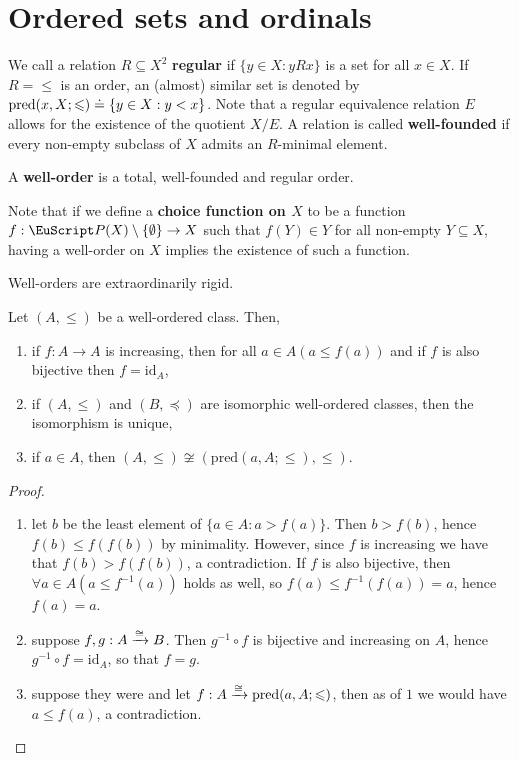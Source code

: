 \documentclass[twoside,openright,titlepage,numbers=noenddot,%
               headinclude,footinclude,cleardoublepage=empty,abstract=on,
               BCOR=23mm,paper=letter,fontsize=11pt
               ]{scrreprt}
\begin{document}
\section{Ordered sets and ordinals}
We call a relation $R \subseteq X^2$ \textbf{regular} if $\{ y \in X: y R x\}$ is a set for all $x \in X$. If $R = \leq$ is an order, an (almost) similar set is denoted by $\mathrm{pred}(x,X;\leqslant) \hskip1mm\dot{=}\hskip1mm \{y \in X: y < x\}$.
Note that a regular equivalence relation $E$ allows for the existence of the quotient $X/E$. A relation is called \textbf{well-founded} if every non-empty subclass of $X$ admits an $R$-minimal element.
\begin{definition}
    A \textbf{well-order} is a total, well-founded and regular order.
\end{definition}
\begin{remark}
    Note that if we define a \textbf{choice function on $X$} to be a function $f: \P(X)\setminus\{\emptyset\} \to X$ such that $f(Y) \in Y$ for all non-empty $Y \subseteq X$, having a well-order on $X$ implies the existence of such a function.
\end{remark}
Well-orders are extraordinarily rigid.
\begin{proposition}
    Let $(A, \leq)$ be a well-ordered class. Then,
    \begin{enumerate}
        \item if $f: A\to A$ is increasing, then for all $a \in A (a \leq f(a))$ and if $f$ is also bijective then $f = \mathrm{id}_A$,
        \item if $(A, \leq)$ and $(B, \preceq)$ are isomorphic well-ordered classes, then the isomorphism is unique,
        \item if $a \in A$, then $(A, \leq) \not\cong (\mathrm{pred}(a,A;\leq),\leq)$.
    \end{enumerate}
\end{proposition}
\begin{proof}
    \begin{enumerate}
        \item let $b$ be the least element of $\{a \in A: a > f(a)\}$. Then $b > f(b)$, hence $f(b) \leq f(f(b))$ by minimality. However, since $f$ is increasing we have that $f(b) > f(f(b))$, a contradiction. If $f$ is also bijective, then $\forall a \in A(a \leq f^{-1}(a))$ holds as well, so $f(a) \leq f^{-1}(f(a)) = a$, hence $f(a) = a$.
        \item suppose $f,g: A \xrightarrow{\cong} B$. Then $g^{-1} \circ f$ is bijective and increasing on $A$, hence $g^{-1} \circ f = \mathrm{id}_A$, so that $f = g$.
        \item suppose they were and let $f: A \xrightarrow{\cong} \mathrm{pred}(a,A;\leqslant)$, then as of $1$ we would have $a \leq f(a)$, a contradiction.
    \end{enumerate}
\end{proof}
\end{document}
